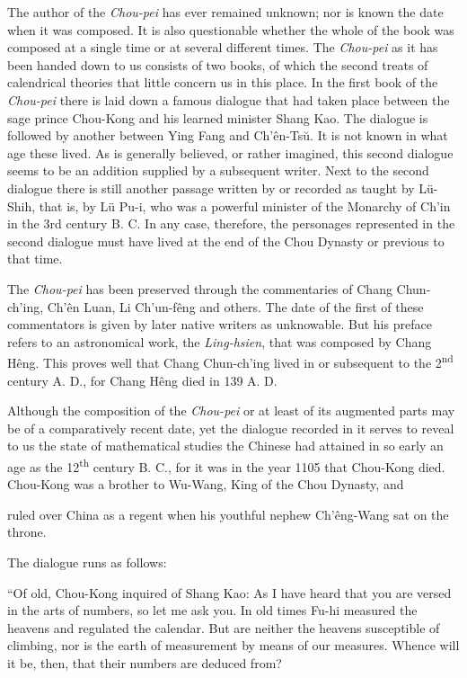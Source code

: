 \documentclass[11pt]{article}
\newcommand{\scanpage}[2]{\clearpage\setcounter{footnote}{0}\noindent{\footnotesize\color{gray}PDF page #1 · #2}\par\medskip}
\newcommand{\scanfooter}{}
\begin{document}
The author of the \emph{Chou-pei} has ever remained unknown; nor is known the date when it was composed. It is also questionable whether the whole of the book was composed at a single time or at several different times. The \emph{Chou-pei} as it has been handed down to us consists of two books, of which the second treats of calendrical theories that little concern us in this place. In the first book of the \emph{Chou-pei} there is laid down a famous dialogue that had taken place between the sage prince Chou-Kong and his learned minister Shang Kao. The dialogue is followed by another between Ying Fang and Ch'ên-Tsŭ. It is not known in what age these lived. As is generally believed, or rather imagined, this second dialogue seems to be an addition supplied by a subsequent writer. Next to the second dialogue there is still another passage written by or recorded as taught by Lü-Shih, that is, by Lü Pu-i, who was a powerful minister of the Monarchy of Ch'in in the 3rd century B. C. In any case, therefore, the personages represented in the second dialogue must have lived at the end of the Chou Dynasty or previous to that time.

The \emph{Chou-pei} has been preserved through the commentaries of Chang Chun-ch'ing, Ch'ên Luan, Li Ch'un-fêng and others. The date of the first of these commentators is given by later native writers as unknowable. But his preface refers to an astronomical work, the \emph{Ling-hsien}, that was composed by Chang Hêng. This proves well that Chang Chun-ch'ing lived in or subsequent to the 2\textsuperscript{nd} century A. D., for Chang Hêng died in 139 A. D.

Although the composition of the \emph{Chou-pei} or at least of its augmented parts may be of a comparatively recent date, yet the dialogue recorded in it serves to reveal to us the state of mathematical studies the Chinese had attained in so early an age as the 12\textsuperscript{th} century B. C., for it was in the year 1105 that Chou-Kong died. Chou-Kong was a brother to Wu-Wang, King of the Chou Dynasty, and
\scanfooter

\scanpage{0019}{Chapter 2, printed page 5}
ruled over China as a regent when his youthful nephew Ch'êng-Wang sat on the throne.

The dialogue runs as follows:

``Of old, Chou-Kong inquired of Shang Kao: As I have heard that you are versed in the arts of numbers, so let me ask you. In old times Fu-hi measured the heavens and regulated the calendar. But are neither the heavens susceptible of climbing, nor is the earth of measurement by means of our measures. Whence will it be, then, that their numbers are deduced from?
\end{document}
